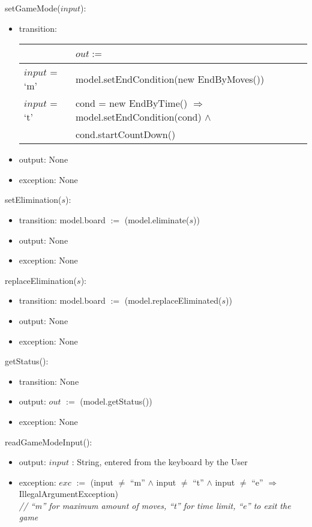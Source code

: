 \documentclass[12pt]{article}
\begin{document}
\noindent setGameMode($input$):
\begin{itemize}
  \item transition:
        \begin{tabular}{| l | l |}
          \hline
          ~ & $out :=$ \\
          \hline
          $input$ = `m' & model.setEndCondition(new EndByMoves()) \\
          \hline
          $input$ = `t' & cond = new EndByTime() $\Rightarrow$ model.setEndCondition(cond) $\wedge$ \\
                           &                                     cond.startCountDown()  \\
          \hline
        \end{tabular}
  \item output: None
  \item exception: None
\end{itemize}

\noindent setElimination($s$):
\begin{itemize}
  \item transition: model.board $:=$ (model.eliminate($s$))
  \item output: None
  \item exception: None
\end{itemize}

\noindent replaceElimination($s$):
\begin{itemize}
  \item transition: model.board $:=$ (model.replaceEliminated($s$))
  \item output: None
  \item exception: None
\end{itemize}

\noindent getStatus():
\begin{itemize}
  \item transition: None
  \item output: $out$ $:=$ (model.getStatus())
  \item exception: None
\end{itemize}

\noindent readGameModeInput():
\begin{itemize}
  \item output: $input$ : String, entered from the keyboard by the User
  \item exception: $exc$ $:=$ (input $\neq$ ``m'' $\wedge$ input $\neq$ ``t'' $\wedge$ input $\neq$ ``e'' $\Rightarrow$ IllegalArgumentException)\\
                              \textit{// ``m'' for maximum amount of moves, ``t'' for time limit, ``e'' to exit the game}
\end{itemize}
\end{document}
